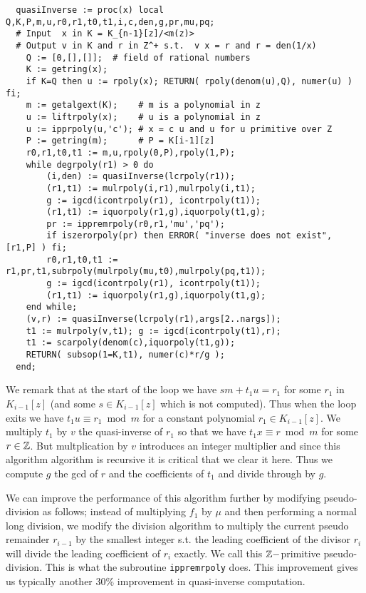 \documentclass[10pt]{article}
\begin{document}
{ \small
\begin{verbatim}
  quasiInverse := proc(x) local Q,K,P,m,u,r0,r1,t0,t1,i,c,den,g,pr,mu,pq;
  # Input  x in K = K_{n-1}[z]/<m(z)>
  # Output v in K and r in Z^+ s.t.  v x = r and r = den(1/x)
    Q := [0,[],[]];  # field of rational numbers
    K := getring(x);
    if K=Q then u := rpoly(x); RETURN( rpoly(denom(u),Q), numer(u) ) fi;
    m := getalgext(K);    # m is a polynomial in z
    u := liftrpoly(x);    # u is a polynomial in z
    u := ipprpoly(u,'c'); # x = c u and u for u primitive over Z
    P := getring(m);      # P = K[i-1][z]
    r0,r1,t0,t1 := m,u,rpoly(0,P),rpoly(1,P);
    while degrpoly(r1) > 0 do
        (i,den) := quasiInverse(lcrpoly(r1));
        (r1,t1) := mulrpoly(i,r1),mulrpoly(i,t1);
        g := igcd(icontrpoly(r1), icontrpoly(t1));
        (r1,t1) := iquorpoly(r1,g),iquorpoly(t1,g);
        pr := ippremrpoly(r0,r1,'mu','pq');
        if iszerorpoly(pr) then ERROR( "inverse does not exist", [r1,P] ) fi;
        r0,r1,t0,t1 := r1,pr,t1,subrpoly(mulrpoly(mu,t0),mulrpoly(pq,t1));
        g := igcd(icontrpoly(r1), icontrpoly(t1));
        (r1,t1) := iquorpoly(r1,g),iquorpoly(t1,g);
    end while;
    (v,r) := quasiInverse(lcrpoly(r1),args[2..nargs]);
    t1 := mulrpoly(v,t1); g := igcd(icontrpoly(t1),r);
    t1 := scarpoly(denom(c),iquorpoly(t1,g));
    RETURN( subsop(1=K,t1), numer(c)*r/g );
  end;
\end{verbatim}
}
We remark that at the start of the loop we have $s m + t_1 u = r_1$ for
some $r_1$ in $K_{i-1}[z]$ (and some $s \in K_{i-1}[z]$ which is not computed).
Thus when the loop exits we have $t_1 u \equiv r_1 \bmod m$ for a constant
polynomial $r_1 \in K_{i-1}[z]$.
We multiply $t_1$ by $v$ the quasi-inverse of $r_1$ so that we
have $t_1 x \equiv r \bmod m$ for some $r \in {\mathbb Z}$.
But multplication by $v$ introduces an integer multiplier and since this
algorithm algorithm is recursive it is critical that we clear it here.
Thus we compute $g$ the gcd of $r$ and the coefficients of $t_1$ and divide
through by $g$.

We can improve the performance of this algorithm further by
modifying pseudo-division as follows; instead of multiplying $f_1$ by $\mu$
and then performing a normal long division, we modify the division algorithm to
multiply the current pseudo remainder $r_{i-1}$ by the smallest integer s.t. the
leading coefficient of the divisor $r_i$ will divide the leading coefficient of $r_i$ exactly.
We call this ${\mathbb Z}-$primitive pseudo-division.
This is what the subroutine {\tt ippremrpoly} does.
This improvement gives us typically another 30\% improvement in quasi-inverse computation.
\end{document}
